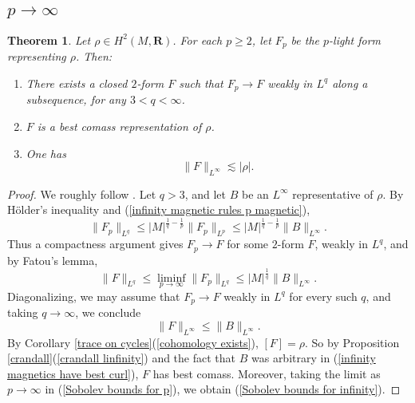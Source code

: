 \documentclass[reqno,11pt]{amsart}
\newcommand{\RR}{\mathbf{R}}
\newtheorem{theorem}{Theorem}[section]
\theoremstyle{definition}
\numberwithin{equation}{section}
\begin{document}
\subsection{\texorpdfstring{$p \to \infty$}{The limit as p goes to infinity}}
\begin{theorem}\label{existence infinity}
Let $\rho \in H^2(M, \RR)$.
For each $p \geq 2$, let $F_p$ be the $p$-light form representing $\rho$. Then:
\begin{enumerate}
\item There exists a closed $2$-form $F$ such that $F_p \to F$ weakly in $L^q$ along a subsequence, for any $3 < q < \infty$.
\item $F$ is a best comass representation of $\rho$.
\item One has 
\begin{equation}\label{Sobolev bounds for infinity}
	\|F\|_{L^\infty} \lesssim |\rho|.
\end{equation}
\end{enumerate}
\end{theorem}
\begin{proof}
We roughly follow \cite[\S3]{Lindqvist14}.
Let $q > 3$, and let $B$ be an $L^\infty$ representative of $\rho$.
By H\"older's inequality and (\ref{infinity magnetic rules p magnetic}),
\begin{equation}\label{uniform bounds in p by best curl}
	\|F_p\|_{L^q} \leq |M|^{\frac{1}{q} - \frac{1}{p}} \|F_p\|_{L^p} \leq |M|^{\frac{1}{q} - \frac{1}{p}} \|B\|_{L^\infty}.
\end{equation}
Thus a compactness argument gives $F_p \to F$ for some $2$-form $F$, weakly in $L^q$, and by Fatou's lemma, 
$$\|F\|_{L^q} \leq \liminf_{p \to \infty} \|F_p\|_{L^q} \leq |M|^{\frac{1}{q}} \|B\|_{L^\infty}.$$
Diagonalizing, we may assume that $F_p \to F$ weakly in $L^q$ for every such $q$, and taking $q \to \infty$, we conclude 
\begin{equation}\label{infinity magnetics have best curl}
	\|F\|_{L^\infty} \leq \|B\|_{L^\infty}.
\end{equation}
By Corollary \ref{trace on cycles}(\ref{cohomology exists}), $[F] = \rho$.
So by Proposition \ref{crandall}(\ref{crandall linfinity}) and the fact that $B$ was arbitrary in (\ref{infinity magnetics have best curl}), $F$ has best comass.
Moreover, taking the limit as $p \to \infty$ in (\ref{Sobolev bounds for p}), we obtain (\ref{Sobolev bounds for infinity}).
\end{proof}
\end{document}
